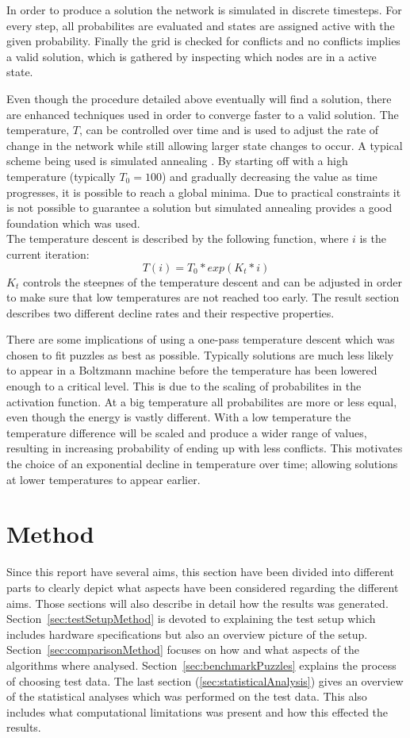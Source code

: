 \documentclass[a4paper,11pt]{kth-mag}
\begin{document}
In order to produce a solution the network is simulated in discrete timesteps.
For every step, all probabilites are evaluated and states are assigned active with the given probability.
Finally the grid is checked for conflicts and no conflicts implies a valid solution, which is gathered by inspecting which nodes are in a active state.

Even though the procedure detailed above eventually will find a solution, there are enhanced techniques used in order to converge faster to a valid solution.
The temperature, $T$, can be controlled over time and is used to adjust the rate of change in the network while still allowing larger state changes to occur.
A typical scheme being used is simulated annealing \cite{simulatedAnnealing}.
By starting off with a high temperature (typically $T_0 = 100$) and gradually decreasing the value as time progresses, it is possible to reach a global minima.
Due to practical constraints it is not possible to guarantee a solution but simulated annealing provides a good foundation which was used.\\

The temperature descent is described by the following function, where $i$ is the current iteration:
\[
T(i) = T_0 * exp(K_t * i)
\]
$K_t$ controls the steepnes of the temperature descent and can be adjusted in order to make sure that low temperatures are not reached too early.
The result section describes two different decline rates and their respective properties.

There are some implications of using a one-pass temperature descent which was chosen to fit puzzles as best as possible.
Typically solutions are much less likely to appear in a Boltzmann machine before the temperature has been lowered enough to a critical level.
This is due to the scaling of probabilites in the activation function.
At a big temperature all probabilites are more or less equal, even though the energy is vastly different.
With a low temperature the temperature difference will be scaled and produce a wider range of values, resulting in increasing probability of ending up with less conflicts.
This motivates the choice of an exponential decline in temperature over time; allowing solutions at lower temperatures to appear earlier.

\chapter{Method}
Since this report have several aims, this section have been divided into different parts to clearly depict what aspects have been considered regarding the different aims. 
Those sections will also describe in detail how the results was generated. 
Section~\ref{sec:testSetupMethod} is devoted to explaining the test setup which includes hardware specifications but also an overview picture of the setup. 
Section~\ref{sec:comparisonMethod} focuses on how and what aspects of the algorithms where analysed.
Section~\ref{sec:benchmarkPuzzles} explains the process of choosing test data.
The last section (\ref{sec:statisticalAnalysis}) gives an overview of the statistical analyses which was performed on the test data.
This also includes what computational limitations was present and how this effected the results. 
\end{document}
